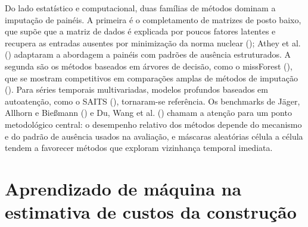 Do lado estatístico e computacional, duas famílias 
de métodos dominam a imputação de painéis. A primeira é o completamento de matrizes de 
posto baixo, que supõe que a matriz de dados é explicada por poucos fatores latentes e 
recupera as entradas ausentes por minimização da norma nuclear (); 
Athey et al. () adaptaram a abordagem a painéis com padrões de ausência estruturados. 
A segunda são os métodos baseados em árvores de decisão, como o missForest 
(), que se mostram competitivos em comparações amplas de métodos 
de imputação (). Para séries temporais multivariadas, 
modelos profundos baseados em autoatenção, como o SAITS (), 
tornaram-se referência. Os benchmarks de Jäger, Allhorn e Bießmann () e Du, 
Wang et al. () chamam a atenção para um ponto metodológico central: o desempenho 
relativo dos métodos depende do mecanismo e do padrão de ausência usados na avaliação, 
e máscaras aleatórias célula a célula tendem a favorecer métodos que exploram vizinhança 
temporal imediata.

\section{Aprendizado de máquina na estimativa de custos da construção}

